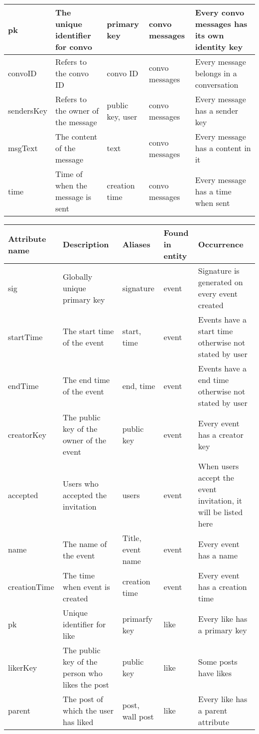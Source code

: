 \begin{landscape}
\begin{tabular}{| p{2cm} | p{4cm} | p{3cm} | p{3cm} | p{6cm} |}
    pk           & The unique identifier for convo    & primary key      & convo messages & Every convo messages has its own identity key \\ \hline
    convoID      & Refers to the convo ID             & convo ID         & convo messages & Every message belongs in a conversation \\ \hline
    sendersKey   & Refers to the owner of the message & public key, user & convo messages & Every message has a sender key \\ \hline
    msgText      & The content of the message         & text             & convo messages & Every message has a content in it \\ \hline
    time         & Time of when the message is sent   & creation time    & convo messages & Every message has a time when sent \\ \hline
    \hline 
    \end{tabular}

    \begin{tabular}{| p{2cm} | p{4cm} | p{3cm} | p{3cm} | p{6cm} |}
    \hline
    Attribute name         & Description                             & Aliases             & Found in entity            & Occurrence          \\ \hline
    sig          & Globally unique primary key               & signature         & event & Signature is generated on every event created \\ \hline
    startTime    & The start time of the event               & start, time       & event & Events have a start time otherwise not stated by user \\ \hline           
    endTime      & The end time of the event                 & end, time         & event & Events have a end time otherwise not stated by user\\ \hline
    creatorKey   & The public key of the owner of the event  & public key        & event & Every event has a creator key \\ \hline
    accepted     & Users who accepted the invitation         & users             & event & When users accept the event invitation, it will be listed here \\ \hline
    name 	     & The name of the event                     & Title, event name & event & Every event has a name \\ \hline
    creationTime & The time when event is created            & creation time     & event & Every event has a creation time \\ \hline

    pk       & Unique identifier for like                      & primarfy key     & like & Every like has a primary key \\ \hline
    likerKey & The public key of the person who likes the post & public key      & like & Some posts have likes \\ \hline
    parent   & The post of which the user has liked            & post, wall post & like & Every like has a parent attribute \\ \hline
    \hline 
    \end{tabular}
\end{landscape}
